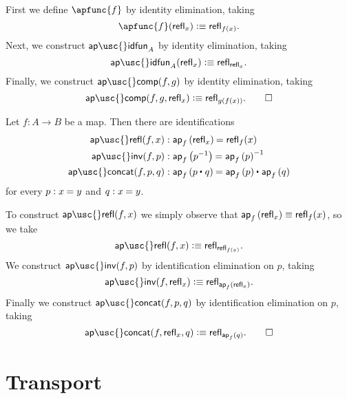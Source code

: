 \begin{constr}
First we define $\apfunc{f}$ by identity elimination, taking
\begin{equation*}
\apfunc{f}(\refl{x})\defeq \refl{f(x)}.
\end{equation*}
Next, we construct $\mathsf{ap\usc{}idfun}_A$ by identity elimination, taking
\begin{equation*}
\mathsf{ap\usc{}idfun}_A(\refl{x}) \defeq \refl{\refl{x}}.
\end{equation*}
Finally, we construct $\mathsf{ap\usc{}comp}(f,g)$ by identity elimination, taking
\begin{equation*}
\mathsf{ap\usc{}comp}(f,g,\refl{x}) \defeq \refl{g(f(x))}.\qedhere
\end{equation*}
\end{constr}

\begin{defn}\label{defn:ap-preserve}
Let $f:A\to B$ be a map. Then there are identifications
\begin{align*}
\mathsf{ap\usc{}refl}(f,x) & : \id{\ap{f}{\refl{x}}}{\refl{f}(x)} \\
\mathsf{ap\usc{}inv}(f,p) & : \id{\ap{f}{p^{-1}}}{\ap{f}{p}^{-1}} \\
\mathsf{ap\usc{}concat}(f,p,q) & : \id{\ap{f}{\ct{p}{q}}}{\ct{\ap{f}{p}}{\ap{f}{q}}}
\end{align*}
for every $p:\id{x}{y}$ and $q:\id{x}{y}$.
\end{defn}

\begin{constr}
To construct $\mathsf{ap\usc{}refl}(f,x)$ we simply observe that ${\mathsf{ap}_{f}\left({\mathsf{refl}_{x}}\right)}\equiv {\mathsf{refl}_{f}(x)}$, so we take
\begin{equation*}
\mathsf{ap\usc{}refl}(f,x)\defeq\refl{\refl{f(x)}}.
\end{equation*}
We construct $\mathsf{ap\usc{}inv}(f,p)$ by identification elimination on $p$, taking
\begin{equation*}
\mathsf{ap\usc{}inv}(f,\refl{x}) \defeq \refl{\ap{f}{\refl{x}}}.
\end{equation*}
Finally we construct $\mathsf{ap\usc{}concat}(f,p,q)$ by identification elimination on $p$, taking
\begin{equation*}
\mathsf{ap\usc{}concat}(f,\refl{x},q)  \defeq \refl{\ap{f}{q}}.\qedhere
\end{equation*}
\end{constr}

\section{Transport}

